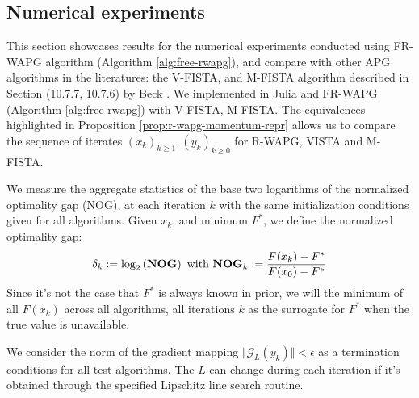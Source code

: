\documentclass[12pt]{article}
\begin{document}
    \subsection{Numerical experiments}
        This section showcases results for the numerical experiments conducted using FR-WAPG algorithm (Algorithm \ref{alg:free-rwapg}), and compare with other APG algorithms in the literatures: the V-FISTA, and M-FISTA algorithm described in Section (10.7.7, 10.7.6) by Beck \cite{beck_first-order_2017}. 
        We implemented in Julia \cite{bezanson_julia_2017} and FR-WAPG (Algorithm \ref{alg:free-rwapg}) with V-FISTA, M-FISTA. 
        The equivalences highlighted in Proposition \ref{prop:r-wapg-momentum-repr} allows us to compare the sequence of iterates $(x_k)_{k \ge 1}, (y_k)_{k \ge0}$ for R-WAPG, VISTA and M-FISTA. 
        \par
        We measure the aggregate statistics of the base two logarithms of the normalized optimality gap (NOG), at each iteration $k$ with the same initialization conditions given for all algorithms.
        Given $x_k$, and minimum $F^*$, we define the normalized optimality gap: 
        \newcommand{\NOG}{\text{\textbf{NOG}}}
        \begin{align*}
            \delta_k := \log_2\left(
                \NOG
            \right)
            \text{ with } 
            \NOG_k := \frac{F(x_k) - F^*}{F(x_0) - F^*}
        \end{align*}
        Since it's not the case that $F^*$ is always known in prior, we will the minimum of all $F(x_k)$ across all algorithms, all iterations $k$ as the surrogate for $F^*$ when the true value is unavailable. 
        \par 
        We consider the norm of the gradient mapping $\Vert \mathcal G_L(y_k)\Vert < \epsilon$ as a termination conditions for all test algorithms. 
        The $L$ can change during each iteration if it's obtained through the specified Lipschitz line search routine. 
\end{document}
